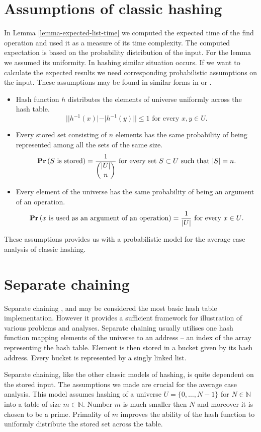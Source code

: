 \section{Assumptions of classic hashing}
In Lemma \ref{lemma-expected-list-time} we computed the expected time of the find operation and used it as a measure of its time complexity. The computed expectation is based on the probability distribution of the input. For the lemma we assumed its uniformity. In hashing similar situation occurs. If we want to calculate the expected results we need corresponding probabilistic assumptions on the input. These assumptions may be found in similar forms in \cite{VK-skripta} or \cite{DBLP:books/sp/Mehlhorn84}.
\begin{itemize}
\item Hash function $h$ distributes the elements of universe uniformly across the hash table.
\[
||h^{-1}(x)| - |h^{-1}(y)|| \leq 1 \text{ for every }x, y \in U \text{.}
\]
\item Every stored set consisting of $n$ elements has the same probability of being represented among all the sets of the same size.
\[
\mathbf{Pr}\left(S \text{ is stored}\right) = \frac{1}{\dbinom{|U|}{n}} \text{ for every set } S \subset U \text{ such that } |S| = n \text{.}
\]
\item Every element of the universe has the same probability of being an argument of an operation.
\[
\mathbf{Pr}\left(x \text{ is used as an argument of an operation}\right) = \frac{1}{|U|} \text{ for every } x \in U \text{.}
\]
\end{itemize}

These assumptions provides us with a probabilistic model for the average case analysis of classic hashing.

\section{Separate chaining}
Separate chaining \cite{The-art-of-computer-programming}, \cite{DBLP:books/sp/Mehlhorn84} and \cite{DBLP:books/sp/MehlhornS2008} may be considered the most basic hash table implementation. However it provides a sufficient framework for illustration of various problems and analyses. Separate chaining usually utilises one hash function mapping elements of the universe to an address -- an index of the array representing the hash table. Element is then stored in a bucket given by its hash address. Every bucket is represented by a singly linked list. 

Separate chaining, like the other classic models of hashing, is quite dependent on the stored input. The assumptions we made are crucial for the average case analysis. This model assumes hashing of a universe $U = \{0, \dots, N - 1\}$ for $N \in \mathbb{N}$ into a table of size $m \in \mathbb{N}$. Number $m$ is much smaller then $N$ and moreover it is chosen to be a prime. Primality of $m$ improves the ability of the hash function to uniformly distribute the stored set across the table. 

